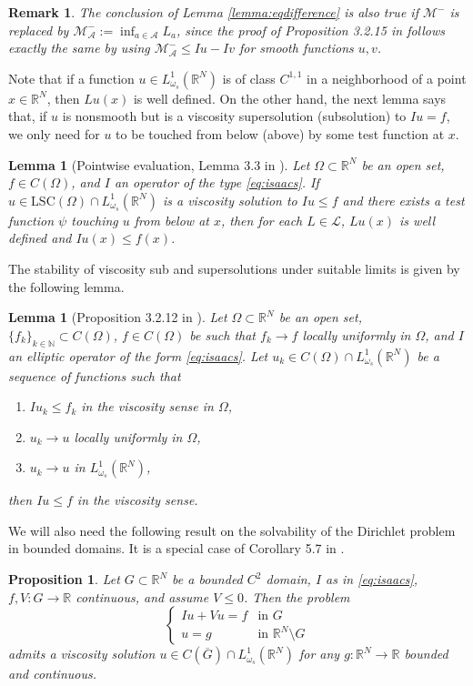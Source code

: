 \documentclass[a4paper,11pt]{article}
\newcommand{\R}{\mathbb{R}}
\newcommand{\N}{\mathbb{N}}
\newcommand{\M}{\mathcal{M}}
\newcommand{\I}{I}
\newcommand{\lsc}{\text{LSC}}
\newcommand{\Lomega}{L_{\omega_s}^1(\R^N)}
\newtheorem{lemma}[theorem]{Lemma}
\newtheorem{proposition}[theorem]{Proposition}
\newtheorem{remark}{Remark}
\begin{document}
\begin{remark}\label{rmk-lemma2}
The conclusion of Lemma \ref{lemma:eqdifference} is also true if $\M^-$ is replaced by $\M^-_{\mathcal{A}}:=\inf_{a\in \mathcal{A}} L_a$, since the proof of Proposition 3.2.15 in \cite{fernandez-real_integro-differential_2024} follows exactly the same by using $\M^-_{\mathcal{A}}\le  Iu -Iv$ for smooth functions $u,v$.
\end{remark}

Note that if a function $u \in \Lomega$ is of class $C^{1,1}$ in a neighborhood of a point $x \in \R^N$, then $Lu(x)$ is well defined. On the other hand, the next lemma says that, if $u$ is nonsmooth but is a viscosity supersolution (subsolution) to $Iu=f$, we only need for $u$ to be touched from below (above) by some test function at $x$.
\begin{lemma}[Pointwise evaluation, Lemma 3.3 in \cite{caffarelli_regularity_2009}]
\label{lemma:one-sided-reg}
Let $\Omega \subset \R^N$ be an open set, $f\in C(\Omega)$, and $I$ an operator of the type \eqref{eq:isaacs}. If $u \in \lsc(\Omega) \cap \Lomega$ is a viscosity solution to 
$ I u \leq f $
and there exists a test function $\psi$ touching $u$ from below at $x$, then for each $L\in \mathcal{L}$, $Lu(x)$ is well defined and $Iu(x) \leq f(x)$.
\end{lemma}

The stability of viscosity sub and supersolutions under suitable limits is given by the following lemma.
\begin{lemma}[Proposition 3.2.12 in \cite{fernandez-real_integro-differential_2024}]
\label{lemma:stability}
Let $\Omega \subset \R^N$ be an open set, $\{f_k\}_{k\in \N}\subset C(\Omega)$, $f\in C(\Omega)$ be such that $f_k \rightarrow f$ locally uniformly in $\Omega$, and $I$ an elliptic operator of the form \eqref{eq:isaacs}. Let $u_k\in C(\Omega)\cap\Lomega$ be a sequence of functions such that 
\begin{enumerate}
\item $I u_k \leq f_k$ in the viscosity sense in $\Omega$,
\item $u_k \rightarrow u$ locally uniformly in $\Omega$,
\item $u_k \rightarrow u$ in $\Lomega$,
\end{enumerate} 
then $I u\leq f$ in the viscosity sense.
\end{lemma}

We will also need the following result on the solvability of the Dirichlet problem in bounded domains. It is a special case of Corollary 5.7 in \cite{mou_perrons_2017}.
\begin{proposition}
\label{prop:existence_isaacs}
Let $G \subset \R^N$ be a bounded $C^2$ domain, $\I$ as in \eqref{eq:isaacs}, $f, V:G \rightarrow \R$ continuous, and assume $V \leq 0$. Then the problem
\[\begin{cases}
\I u + Vu = f & \text{in } G \\
u = g & \text{in } \R^N \setminus G 
\end{cases}\]
admits a viscosity solution $u\in C(\overline{G}) \cap \Lomega$ for any $g:\R^N \rightarrow \R$ bounded and continuous.
\end{proposition}
\end{document}
